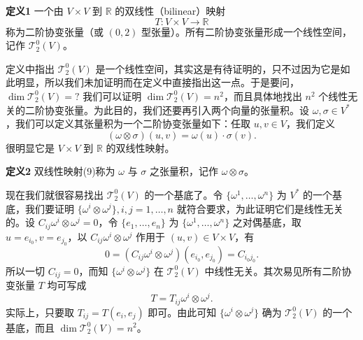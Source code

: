 \noindent\textbf{定义1}
一个由 $V\times V$ 到 $\mathbb R$ 的双线性（bilinear）映射
\begin{equation}
 T:V\times V\longrightarrow\mathbb R
 \tag{8}
\end{equation}
称为二阶协变张量（或 $(0,2)$ 型张量）。所有二阶协变张量形成一个线性空间，记作 $\mathcal T^0_2(V)$。

定义中指出 $\mathcal T^0_2(V)$ 是一个线性空间，其实这是有待证明的，只不过因为它是如此明显，所以我们未加证明而在定义中直接指出这一点。于是要问，$\dim\mathcal T^0_2(V)=?$ 我们可以证明 $\dim\mathcal T^0_2(V)=n^2$，而且具体地找出 $n^2$ 个线性无关的二阶协变张量。为此目的，我们还要再引入两个向量的张量积。设 $\omega,\sigma\in V^*$，我们可以定义其张量积为一个二阶协变张量如下：任取 $u,v\in V$，我们定义
\begin{equation}
 (\omega\otimes\sigma)(u,v)=\omega(u)\cdot\sigma(v).
 \tag{9}
\end{equation}
很明显它是 $V\times V$ 到 $\mathbb R$ 的双线性映射。

\noindent\textbf{定义2}
双线性映射(9)称为 $\omega$ 与 $\sigma$ 之张量积，记作 $\omega\otimes\sigma$。

现在我们就很容易找出 $\mathcal T^0_2(V)$ 的一个基底了。令 $\{\omega^1,\ldots,\omega^n\}$ 为 $V^*$ 的一个基底，我们要证明 $\{\omega^i\otimes\omega^j\},i,j=1,\ldots,n$ 就符合要求，为此证明它们是线性无关的。设 $C_{ij}\omega^i\otimes\omega^j=0$，令 $\{e_1,\ldots,e_n\}$ 为 $\{\omega^1,\ldots,\omega^n\}$ 之对偶基底，取 $u=e_{i_0},v=e_{j_0}$，以 $C_{ij}\omega^i\otimes\omega^j$ 作用于 $(u,v)\in V\times V$，有
\[
 0=(C_{ij}\omega^i\otimes\omega^j)(e_{i_0},e_{j_0})=C_{i_0j_0}.
\]
所以一切 $C_{ij}=0$，而知 $\{\omega^i\otimes\omega^j\}$ 在 $\mathcal T^0_2(V)$ 中线性无关。其次易见所有二阶协变张量 $T$ 均可写成
\begin{equation}
 T=T_{ij}\omega^i\otimes\omega^j.
 \tag{10}
\end{equation}
实际上，只要取 $T_{ij}=T(e_i,e_j)$ 即可。由此可知 $\{\omega^i\otimes\omega^j\}$ 确为 $\mathcal T^0_2(V)$ 的一个基底，而且 $\dim\mathcal T^0_2(V)=n^2$。

